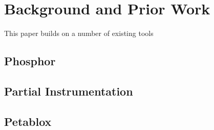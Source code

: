 \chapter{Background and Prior Work}
This paper builds on a number of existing tools
\section{Phosphor}
\section{Partial Instrumentation}
\section{Petablox}
